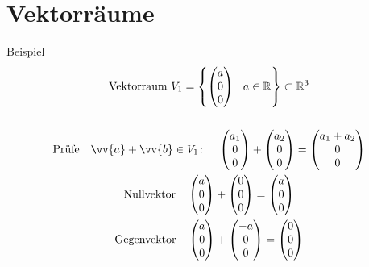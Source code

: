 \section{Vektorräume}
Beispiel
\begin{gather*}
  \text{Vektorraum } V_1 = \left\{\begin{pmatrix}a \\ 0 \\ 0\end{pmatrix} \Bigm| a \in \mathbb{R}\right\} \subset \mathbb{R}^3 \\\\
  \text{Prüfe}\quad \vv{a} + \vv{b} \in V_1 \colon \quad \begin{pmatrix}a_1 \\ 0 \\ 0\end{pmatrix} + \begin{pmatrix}a_2 \\ 0 \\ 0\end{pmatrix} = \begin{pmatrix}a_1 + a_2 \\ 0 \\ 0\end{pmatrix} \\
  \text{Nullvektor}\quad \begin{pmatrix}a \\ 0 \\ 0\end{pmatrix} + \begin{pmatrix}0 \\ 0 \\ 0\end{pmatrix} = \begin{pmatrix}a \\ 0 \\ 0\end{pmatrix} \\
  \text{Gegenvektor}\quad \begin{pmatrix}a \\ 0 \\ 0\end{pmatrix} + \begin{pmatrix}-a \\ 0 \\ 0\end{pmatrix} = \begin{pmatrix}0 \\ 0 \\ 0\end{pmatrix} \\

\end{gather*}
